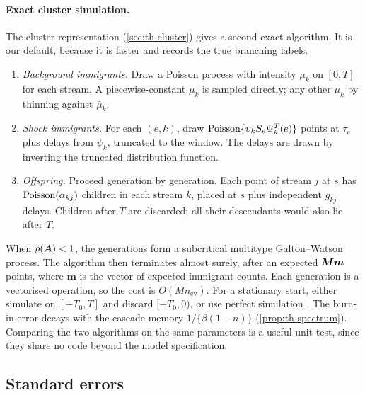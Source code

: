 \paragraph{Exact cluster simulation.} The cluster representation (\cref{sec:th-cluster})
gives a second exact algorithm. It is our default, because it is faster and records the
true branching labels.
\begin{enumerate}[(1)]
  \item \emph{Background immigrants.} Draw a Poisson process with intensity $\mu_k$ on
    $[0,T]$ for each stream. A piecewise-constant $\mu_k$ is sampled directly; any other
    $\mu_k$ by thinning against $\bar\mu_k$.
  \item \emph{Shock immigrants.} For each $(e,k)$, draw $\operatorname{Poisson}\{\upsilon_kS_e\Psi^T_k(e)\}$
    points at $\tau_e$ plus delays from $\psi_k$, truncated to the window. The delays are
    drawn by inverting the truncated distribution function.
  \item \emph{Offspring.} Proceed generation by generation. Each point of stream $j$ at
    $s$ has $\operatorname{Poisson}(\alpha_{kj})$ children in each stream $k$, placed at $s$ plus
    independent $g_{kj}$ delays. Children after $T$ are discarded; all their descendants
    would also lie after $T$.
\end{enumerate}
When $\varrho(\bm{A})<1$, the generations form a subcritical multitype Galton--Watson process.
The algorithm then terminates almost surely, after an expected $\bm{M}\bm m$ points, where
$\bm m$ is the vector of expected immigrant counts. Each generation is a vectorised
operation, so the cost is $O(Mn_{\mathrm{ev}})$. For a stationary start, either simulate on $[-T_0,T]$
and discard $[-T_0,0)$, or use perfect simulation \citep{moller2005}. The burn-in error
decays with the cascade memory $1/\{\beta(1-n)\}$ (\cref{prop:th-spectrum}). Comparing the
two algorithms on the same parameters is a useful unit test, since they share no code
beyond the model specification.

\subsection{Standard errors}\label{app:comp-se}

